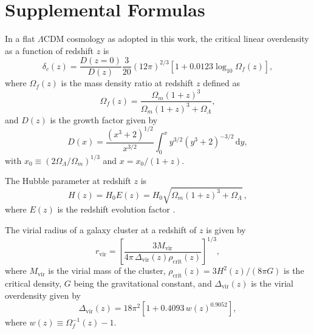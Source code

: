 \documentclass[twocolumn]{aastex62}
\newcommand{\R}[1]{\mathrm{#1}}
\newcommand{\D}[1]{\R{d} #1}
\newcommand{\lcdm}{$\Lambda$CDM}
\begin{document}
\renewcommand\thetable{\thesection\arabic{table}}
\setcounter{table}{0}


\section{Supplemental Formulas}
\label{sec:formulas}

In a flat \lcdm{} cosmology as adopted in this work, the critical linear
overdensity as a function of redshift $z$ is \citep{kitayama1996,randall2002}
\begin{equation}
  \label{eq:delta-crit}
  \delta_c(z) = \frac{D(z=0)}{D(z)} \frac{3}{20} (12\pi)^{2/3}
    \left[1 + 0.0123 \log_{10} \Omega_f(z) \right],
\end{equation}
where $\Omega_f(z)$ is the mass density ratio at redshift $z$ defined as
\begin{equation}
  \label{eq:omega-fz}
  \Omega_f(z) = \frac{\Omega_m(1+z)^3}{\Omega_m(1+z)^3 + \Omega_{\Lambda}},
\end{equation}
and $D(z)$ is the growth factor given by \citep[equation~(13.6)]{peebles1980}
\begin{equation}
  \label{eq:growth-factor}
  D(x) = \frac{(x^3 + 2)^{1/2}}{x^{3/2}}
    \int_0^x y^{3/2} (y^3 + 2)^{-3/2} \,\D{y},
\end{equation}
with $x_0 \equiv (2\Omega_{\Lambda}/\Omega_m)^{1/3}$ and $x = x_0 / (1+z)$.

The Hubble parameter at redshift $z$ is
\begin{equation}
  \label{eq:hubble-z}
  H(z) = H_0 E(z) = H_0 \sqrt{\Omega_m(1+z)^3 + \Omega_{\Lambda}} \,,
\end{equation}
where $E(z)$ is the redshift evolution factor \citep{hogg1999}.

The virial radius of a galaxy cluster at a redshift of $z$ is given by
\begin{equation}
  \label{eq:radius-virial}
  r_{\R{vir}} = \left[
    \frac{3 M_{\R{vir}}}{4\pi \,\Delta_{\R{vir}}(z) \rho_{\R{crit}}(z)}
  \right]^{1/3},
\end{equation}
where $M_{\R{vir}}$ is the virial mass of the cluster,
$\rho_{\R{crit}}(z) = 3 H^2(z) / (8\pi G)$ is the critical density,
$G$ being the gravitational constant, and $\Delta_{\R{vir}}(z)$ is the
virial overdensity given by \citep{kitayama1996,cassano2005}
\begin{equation}
  \label{eq:delta-vir}
  \Delta_{\R{vir}}(z) = 18\pi^2 \left[ 1 + 0.4093 \, w(z)^{0.9052} \right],
\end{equation}
where $w(z) \equiv \Omega_f^{-1}(z) - 1$.
\end{document}
